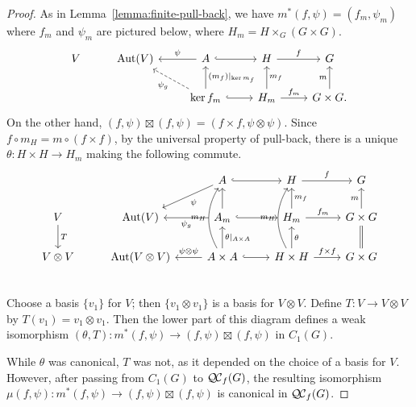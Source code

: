 \documentclass[11pt]{amsart}
\theoremstyle{plain}
\theoremstyle{definition}
\theoremstyle{remark}
\newcommand{\bFq}{\bar{k}}
\newcommand{\Fq}{k}
\DeclareMathOperator{\Gal}{Gal}
\newcommand{\Frob}[1]{\operatorname{F}_{#1}}
\DeclareMathOperator{\Aut}{Aut}
\newcommand{\ceq}{{\, :=\, }}
\newcommand{\QC}{{\mathcal{Q\hskip-0.8pt C}}}
\newcommand{\QCf}{{\QC_f}}
\newcommand\Clifton[1]{\marginpar{\smaller\smaller CC: #1}}
\begin{document}
\begin{proof}
As in Lemma~\ref{lemma:finite-pull-back}, we have $m^*(f,\psi) = (f_m,\psi_m)$ where $f_m$ and $\psi_m$ are pictured below, where $H_m = H\times_G(G\times G)$.
\[
\begin{tikzcd}
V & \Aut(V) & \arrow[swap]{l}{\psi} A \arrow[hook]{r} & H \arrow{r}{f} &  G\\
  &  & \arrow[dashed]{ul}{\psi_g} \arrow[swap]{u}{(m_f)\vert_{\ker m_f}} \ker f_m \arrow[hook]{r} & \arrow[swap]{u}{m_f} H_m \arrow{r}{f_m} & \arrow{u}{m} G\times G.
\end{tikzcd}
\]
On the other hand, $(f,\psi) \boxtimes (f,\psi) = (f\times f, \psi\otimes \psi)$.
Since $f\circ m_H = m \circ (f\times f)$, by the universal property of pull-back, there is a unique $\theta : H\times H \to H_m$ making the following commute.
\[
\begin{tikzcd}
\ &  & \arrow{ld}{\psi} A \arrow[hook]{r} & H \arrow{r}{f} &  G\\
V \arrow{d}{T} & \Aut(V)  & \arrow{l}{\psi_g} \arrow{u} A_m \arrow[hook]{r} & \arrow[swap]{u}{m_f} H_m \arrow{r}{f_m} & \arrow{u}{m} G\times G\\
V\otimes V & \Aut(V\otimes V) & \arrow[swap]{l}{\psi\otimes\psi} \arrow[bend left]{uu}{m_H} \arrow[swap]{u}{\theta\vert_{A\times A}} A \times A \arrow[hook]{r}{} & \arrow[bend left]{uu}{m_H} \arrow[swap]{u}{\theta} H \times H \arrow{r}{f\times f} & \arrow[equal]{u} G\times G\\
\end{tikzcd}
\]
Choose a basis $\{ v_1 \}$ for $V$; then $\{ v_1\otimes v_1 \}$ is a basis for $V\otimes V$. Define $T : V \to V\otimes V$ by $T(v_1) = v_1\otimes v_1$. Then the lower part of this diagram defines a weak isomorphism $(\theta,T): m^*(f,\psi) \to (f,\psi)\boxtimes (f,\psi)$  in $C_1(G)$. 

While $\theta$ was canonical, $T$ was not, as it depended on the choice of a basis for $V$. However, after passing from $C_1(G)$ to $\QCf(G)$, the resulting isomorphism $\mu(f,\psi): m^*(f,\psi) \to (f,\psi)\boxtimes (f,\psi)$ is canonical in $\QCf(G)$.
\end{proof}



\end{document}
